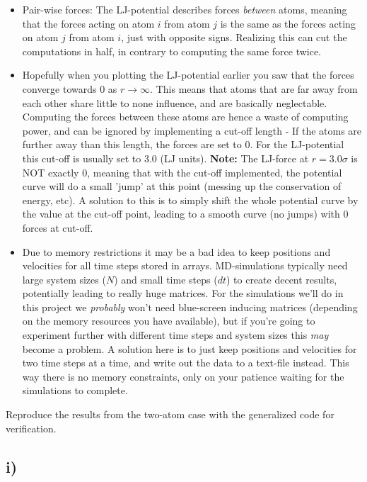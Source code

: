 \documentclass[11pt,british,a4paper]{report}
\begin{document}
\begin{itemize}
  \item Pair-wise forces: The LJ-potential describes forces \textit{between} atoms, meaning that the forces acting on atom $i$ from atom $j$ is the same as the forces acting on atom $j$
  from atom $i$, just with opposite signs. Realizing this can cut the computations in half, in contrary to computing the same force twice.
  \item Hopefully when you plotting the LJ-potential earlier you saw that the forces converge towards 0 as $r \rightarrow \infty$. This means that atoms that are far away from each other
  share little to none influence, and are basically neglectable. Computing the forces between these atoms are hence a waste of computing power, and can be ignored by implementing a cut-off
  length - If the atoms are further away than this length, the forces are set to 0. For the LJ-potential this cut-off is usually set to 3.0 (LJ units).
  \textbf{Note:} The LJ-force at $r = 3.0\sigma$ is NOT exactly 0, meaning that with the cut-off implemented, the potential curve will do a small 'jump' at this point (messing up the
  conservation of energy, etc).
  A solution to this is to simply shift the whole potential curve by the value at the cut-off point, leading to a smooth curve (no jumps) with 0 forces at cut-off.
  \item Due to memory restrictions it may be a bad idea to keep positions and velocities for all time steps stored in arrays. MD-simulations typically need large system sizes ($N$)
  and small time steps ($dt$) to create decent results, potentially leading to really huge matrices. For the simulations we'll do in this project we \textit{probably} won't need blue-screen
  inducing matrices (depending on the memory resources you have available), but if you're going to experiment further with different time steps and system sizes this \textit{may} become
  a problem. A solution here is to just keep positions and velocities for two time steps at a time, and write out the data to a text-file instead. This way there is no memory constraints,
  only on your patience waiting for the simulations to complete.

\end{itemize}

Reproduce the results from the two-atom case with the generalized code for verification.

\subsection*{i)}
\end{document}
